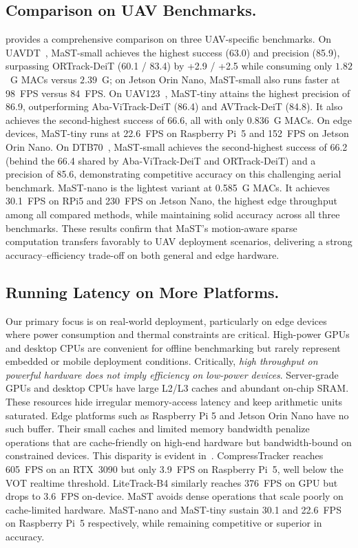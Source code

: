 \subsection{Comparison on UAV Benchmarks.}
 provides a comprehensive comparison on three UAV-specific benchmarks.
On UAVDT~\cite{uavdt}, MaST-small achieves the highest success (63.0) and precision (85.9), surpassing ORTrack-DeiT (60.1 / 83.4) by +2.9 / +2.5 while consuming only $1.82$~G MACs versus $2.39$~G; on Jetson Orin Nano, MaST-small also runs faster at 98~FPS versus 84~FPS.
On UAV123~\cite{uav123}, MaST-tiny attains the highest precision of 86.9, outperforming Aba-ViTrack-DeiT (86.4) and AVTrack-DeiT (84.8). It also achieves the second-highest success of 66.6, all with only 0.836~G MACs. On edge devices, MaST-tiny runs at 22.6~FPS on Raspberry Pi~5 and 152~FPS on Jetson Orin Nano.
On {DTB70}~\cite{dtb70}, MaST-small achieves the second-highest success of 66.2 (behind the 66.4 shared by Aba-ViTrack-DeiT and ORTrack-DeiT) and a precision of 85.6, demonstrating competitive accuracy on this challenging aerial benchmark.
MaST-nano is the lightest variant at 0.585~G MACs. It achieves 30.1~FPS on RPi5 and 230~FPS on Jetson Nano, the highest edge throughput among all compared methods, while maintaining solid accuracy across all three benchmarks.
These results confirm that MaST's motion-aware sparse computation transfers favorably to UAV deployment scenarios, delivering a strong accuracy--efficiency trade-off on both general and edge hardware.


\subsection{Running Latency on More Platforms.}
Our primary focus is on real-world deployment, particularly on edge devices where power consumption and thermal constraints are critical. High-power GPUs and desktop CPUs are convenient for offline benchmarking but rarely represent embedded or mobile deployment conditions.
Critically, \emph{high throughput on powerful hardware does not imply efficiency on low-power devices}.
Server-grade GPUs and desktop CPUs have large L2/L3 caches and abundant on-chip SRAM. These resources hide irregular memory-access latency and keep arithmetic units saturated. Edge platforms such as Raspberry Pi 5 and Jetson Orin Nano have no such buffer. Their small caches and limited memory bandwidth penalize operations that are cache-friendly on high-end hardware but bandwidth-bound on constrained devices.
This disparity is evident in~. CompressTracker reaches 605~FPS on an RTX~3090 but only 3.9~FPS on Raspberry Pi~5, well below the VOT realtime threshold. LiteTrack-B4 similarly reaches 376~FPS on GPU but drops to 3.6~FPS on-device. MaST avoids dense operations that scale poorly on cache-limited hardware. MaST-nano and MaST-tiny sustain 30.1 and 22.6~FPS on Raspberry Pi~5 respectively, while remaining competitive or superior in accuracy.



